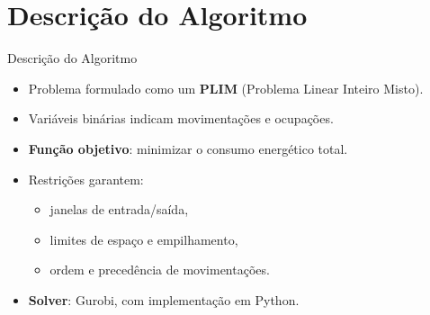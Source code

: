 \section{Descrição do Algoritmo}

\begin{frame}{Descrição do Algoritmo}

\begin{itemize}
    \item Problema formulado como um \textbf{PLIM} (Problema Linear Inteiro Misto).
    \item Variáveis binárias indicam movimentações e ocupações.
    \item \textbf{Função objetivo}: minimizar o consumo energético total.
    \item Restrições garantem:
    \begin{itemize}
        \item janelas de entrada/saída,
        \item limites de espaço e empilhamento,
        \item ordem e precedência de movimentações.
    \end{itemize}
    \item \textbf{Solver}: Gurobi, com implementação em Python.
\end{itemize}

\end{frame}
